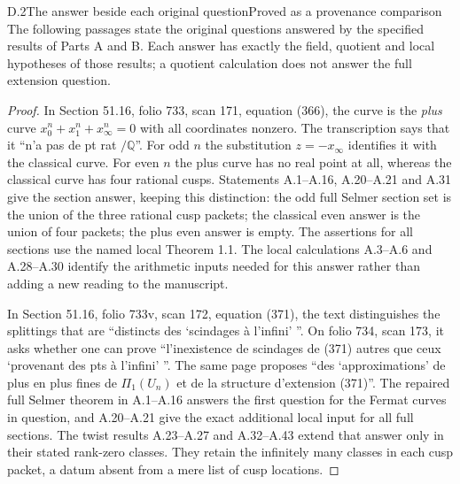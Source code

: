 \begin{statement}{D.2}{The answer beside each original question}{Proved as a provenance comparison}
The following passages state the original questions answered by the
specified results of Parts A and B. Each answer has exactly the field,
quotient and local hypotheses of those results; a quotient calculation
does not answer the full extension question.
\end{statement}
\begin{proof}
In Section 51.16, folio 733, scan 171, equation (366), the curve is the
\emph{plus} curve $x_0^n+x_1^n+x_\infty^n=0$ with all coordinates nonzero.
The transcription says that it ``n'a pas de pt rat $/\mathbb Q$''.
For odd $n$ the substitution $z=-x_\infty$ identifies it with the
classical curve. For even $n$ the plus curve has no real point at all,
whereas the classical curve has four rational cusps. Statements A.1--A.16,
A.20--A.21 and A.31 give the section answer, keeping this distinction:
the odd full Selmer section set is the union of the three rational cusp
packets; the classical even answer is the union of four packets; the plus
even answer is empty. The assertions for all sections use the named local
Theorem 1.1. The local calculations A.3--A.6 and A.28--A.30 identify the
arithmetic inputs needed for this answer rather than adding a new reading
to the manuscript.

In Section 51.16, folio 733v, scan 172, equation (371), the text distinguishes
the splittings that are ``distincts des `scindages \`a l'infini' ''.
On folio 734, scan 173, it asks whether one can prove
``l'inexistence de scindages de (371) autres que ceux `provenant des pts
\`a l'infini' ''. The same page proposes ``des `approximations' de plus
en plus fines de $\Pi_1(U_n)$ et de la structure d'extension (371)''.
The repaired full Selmer theorem in A.1--A.16 answers the first question
for the Fermat curves in question, and A.20--A.21 give the exact additional
local input for all full sections. The twist results A.23--A.27 and A.32--A.43
extend that answer only in their stated rank-zero classes. They retain
the infinitely many classes in each cusp packet, a datum absent from a
mere list of cusp locations.


\end{proof}
